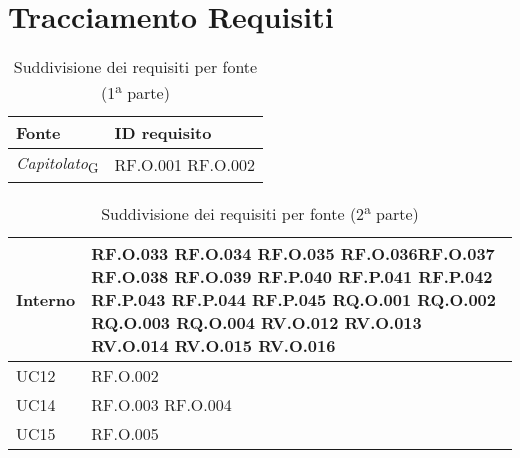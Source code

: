 \section{Tracciamento Requisiti}
\begin{table}[H]
\centering
    \begin{tabular}{|C{3.0cm}|C{3.0cm}|}
        \hline
         \textbf{Fonte} &
         \textbf{ID requisito}   
          \\
          \hline
          \textit{Capitolato}\textsubscript{G} & RF.O.001 \newline RF.O.002\\
\hline
    \end{tabular}
    \caption{Suddivisione dei requisiti per fonte (1\textsuperscript{a} parte)}
\end{table}
\begin{table}[H]
\centering
    \begin{tabular}{|C{3.0cm}|C{3.0cm}|}
        \hline
          Interno & 
          RF.O.033  \newline RF.O.034  \newline RF.O.035  \newline  RF.O.036\newline RF.O.037 \newline
          RF.O.038  \newline RF.O.039  \newline RF.P.040  \newline  RF.P.041 \newline RF.P.042 \newline
          RF.P.043  \newline RF.P.044 \newline RF.P.045  \newline  RQ.O.001  \newline RQ.O.002  \newline
          RQ.O.003 \newline RQ.O.004  \newline RV.O.012  \newline  RV.O.013   \newline RV.O.014   \newline
          RV.O.015   \newline RV.O.016   \\
          \hline       
          UC12 & RF.O.002 \\
          \hline 
          UC14 & RF.O.003  \newline RF.O.004 \\
          \hline 
          UC15 & RF.O.005 \\
          \hline
    \end{tabular}
    \caption{Suddivisione dei requisiti per fonte (2\textsuperscript{a} parte)}
\end{table}

